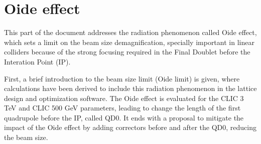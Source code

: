 \chapter{Oide effect}
This part of the document addresses the radiation phenomenon called Oide effect\cite{Oide}, which sets a limit on the beam size demagnification, specially important in linear colliders because of the strong focusing required in the Final Doublet before the Interation Point (IP).\par
First, a brief introduction to the beam size limit (Oide limit) is given, where calculations have been derived to include this radiation phenomenon in the lattice design and optimization software. The Oide effect is evaluated for the CLIC 3 TeV and CLIC 500 GeV parameters, leading to change the length of the first quadrupole before the IP, called QD0. It ends with a proposal to mitigate the impact of the Oide effect by adding correctors before and after the QD0, reducing the beam size.\par
